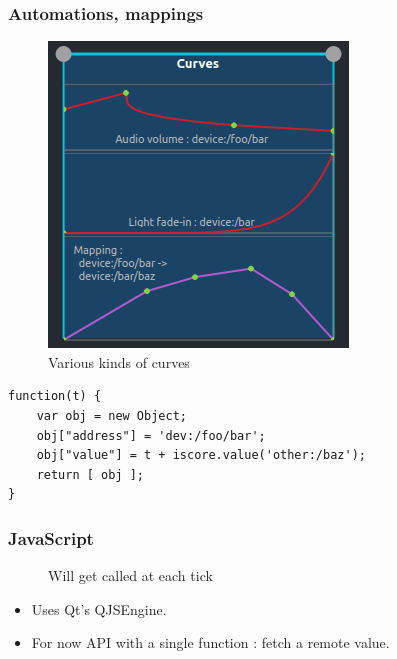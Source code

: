 \documentclass{beamer}
\begin{document}
    
    \begin{frame}
        \frametitle{Automations, mappings}
        \begin{figure}
        	\centering
        	\includegraphics[scale=0.7]{images/curves.png}
        	\caption{Various kinds of curves}
        \end{figure}    
        
    \end{frame}
    
    \begin{lrbox}{\codebox}
    	\begin{lstlisting}
function(t) { 
    var obj = new Object; 
    obj["address"] = 'dev:/foo/bar'; 
    obj["value"] = t + iscore.value('other:/baz'); 
    return [ obj ]; 
}
    	\end{lstlisting}
    \end{lrbox}
    
    \begin{frame}
    	\frametitle{JavaScript}
    	\begin{figure}
    		\centering
    	    \usebox{\codebox}
    	    \caption{Will get called at each tick}
    	\end{figure}
    	
    	\begin{itemize}
    		\item Uses Qt's QJSEngine.
    		\item For now API with a single function : fetch a remote value.
    	\end{itemize}
    \end{frame}
    
\end{document}
